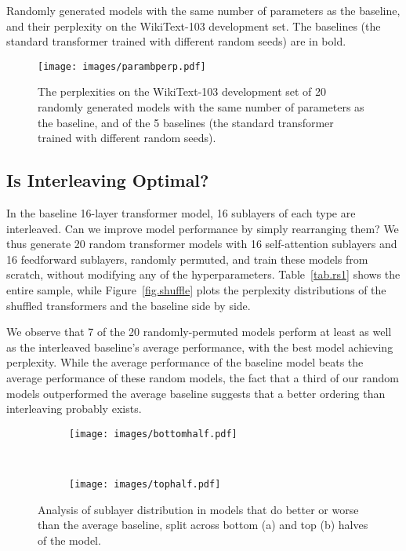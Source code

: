 \documentclass[11pt,a4paper]{article}
\begin{document}
\begin{table}[t]
 \caption{Randomly generated models with the same number of parameters as the baseline, and their perplexity on the WikiText-103 development set. The baselines (the standard transformer trained with different random seeds) are in bold.}
\label{tab.budget}
\end{table}

\begin{figure}[t]
\centering
\texttt{[image: images/parambperp.pdf]}
\caption{The perplexities on the WikiText-103 development set of 20 randomly generated models with the same number of parameters as the baseline, and of the 5 baselines (the standard transformer trained with different random seeds).} 
\label{fig.budget}
\end{figure}

\subsection{Is Interleaving Optimal?}
\label{sec.interleaving}

In the baseline 16-layer transformer model, 16 sublayers of each type are interleaved. Can we improve model performance by simply rearranging them?
We thus generate 20 random transformer models with 16 self-attention sublayers and 16 feedforward sublayers, randomly permuted, and train these models from scratch, without modifying any of the hyperparameters. 
Table~\ref{tab.rs1} shows the entire sample, while Figure~\ref{fig.shuffle} plots the perplexity distributions of the shuffled transformers and the baseline side by side.

We observe that 7 of the 20 randomly-permuted models perform at least as well as the interleaved baseline's average performance, with the best model achieving  perplexity.
While the average performance of the baseline model beats the average performance of these random models, the fact that a third of our random models outperformed the average baseline suggests that a better ordering than interleaving probably exists.



\begin{figure*}[t]
\begin{subfigure}[t]{0.48\linewidth}
\centering
\texttt{[image: images/bottomhalf.pdf]}
\caption{}
\end{subfigure}
~
\begin{subfigure}[t]{0.48\linewidth}
\centering
\texttt{[image: images/tophalf.pdf]}
\caption{}
\end{subfigure}
\caption{Analysis of sublayer distribution in models that do better or worse than the average  baseline, split across bottom (a) and top (b) halves of the model.}
\label{fig.split}
\end{figure*}
\end{document}
